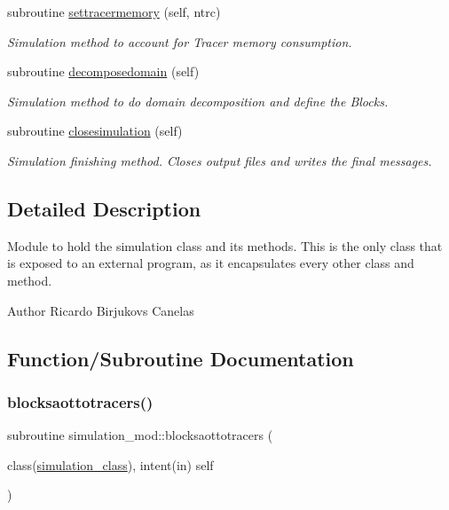 \begin{DoxyCompactItemize}
subroutine \mbox{\hyperlink{namespacesimulation__mod_acc5fa823c8dd599de8feda8988c224f2}{settracermemory}} (self, ntrc)
\begin{DoxyCompactList}\small\item\em Simulation method to account for Tracer memory consumption. \end{DoxyCompactList}\item 
subroutine \mbox{\hyperlink{namespacesimulation__mod_a2b8198a9fb3f7671c6b45192a0b9740c}{decomposedomain}} (self)
\begin{DoxyCompactList}\small\item\em Simulation method to do domain decomposition and define the Blocks. \end{DoxyCompactList}\item 
subroutine \mbox{\hyperlink{namespacesimulation__mod_a4285722eaa589fa671233554b54c74f8}{closesimulation}} (self)
\begin{DoxyCompactList}\small\item\em Simulation finishing method. Closes output files and writes the final messages. \end{DoxyCompactList}\end{DoxyCompactItemize}


\subsection{Detailed Description}
Module to hold the simulation class and its methods. This is the only class that is exposed to an external program, as it encapsulates every other class and method. 

\begin{DoxyAuthor}{Author}
Ricardo Birjukovs Canelas 
\end{DoxyAuthor}


\subsection{Function/\+Subroutine Documentation}
\mbox{\label{namespacesimulation__mod_a03afd8682d3239c0ce8eb1637e4da806}} 
\subsubsection{\texorpdfstring{blocksaottotracers()}{blocksaottotracers()}}
{\footnotesize\ttfamily subroutine simulation\+\_\+mod\+::blocksaottotracers (\begin{DoxyParamCaption}\item[{class(\mbox{\hyperlink{structsimulation__mod_1_1simulation__class}{simulation\+\_\+class}}), intent(in)}]{self }\end{DoxyParamCaption})\hspace{0.3cm}{\ttfamily [private]}}



